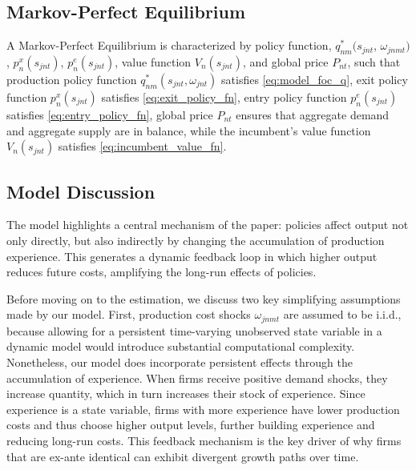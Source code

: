 \documentclass[12pt]{article}
\begin{document}
\subsection{Markov-Perfect Equilibrium}
A Markov-Perfect Equilibrium is characterized by policy function, $q^*_{nm}(s_{jnt}$, $\omega_{jnmt})$, $p_n^x(s_{jnt})$, $p_n^e(s_{jnt})$, value function $V_n(s_{jnt})$, and global price $P_{nt}$, such that production policy function $q^*_{nm}(s_{jnt},\omega_{jnt})$ satisfies \eqref{eq:model_foc_q}, exit policy function $p_n^x(s_{jnt})$ satisfies \eqref{eq:exit_policy_fn}, entry policy function $p_n^e(s_{jnt})$ satisfies \eqref{eq:entry_policy_fn}, global price $P_{nt}$ ensures that aggregate demand and aggregate supply are in balance, while the incumbent's value function $V_n(s_{jnt})$ satisfies \eqref{eq:incumbent_value_fn}.

\subsection{Model Discussion}
The model highlights a central mechanism of the paper: policies affect output not only directly, but also indirectly by changing the accumulation of production experience. This generates a dynamic feedback loop in which higher output reduces future costs, amplifying the long-run effects of policies. %

Before moving on to the estimation, we discuss two key simplifying assumptions made by our model. 
First, production cost shocks $\omega_{jnmt}$ are assumed to be i.i.d., because allowing for a persistent time-varying unobserved state variable in a dynamic model would introduce substantial computational complexity. Nonetheless, our model does incorporate persistent effects through the accumulation of experience. When firms receive positive demand shocks, they increase quantity, which in turn increases their stock of experience.  Since experience is a state variable, firms with more experience have lower production costs and thus choose higher output levels, further building experience and reducing long-run costs. This feedback mechanism is the key driver of why firms that are ex-ante identical can exhibit divergent growth paths over time.
\end{document}
